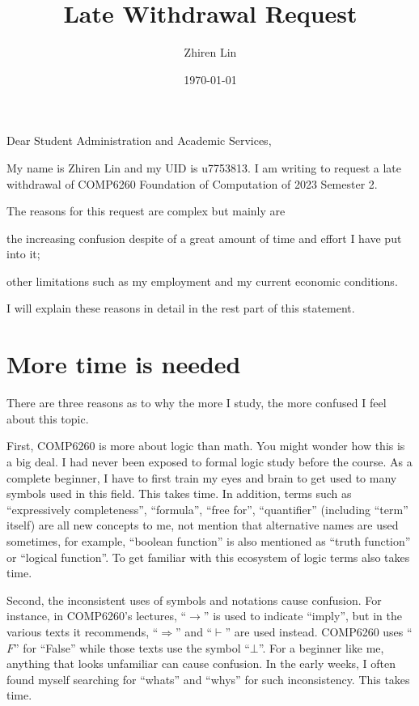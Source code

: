 \documentclass[12pt,a4paper]{article}
\title{Late Withdrawal Request}
\author{Zhiren Lin}
\date{\today}
\begin{document}
\maketitle

\noindent
Dear Student Administration and Academic Services,

My name is Zhiren Lin and my UID is u7753813. I am writing to request a late withdrawal of COMP6260 Foundation of Computation of 2023 Semester 2.

The reasons for this request are complex but mainly are
\begin{enumerate*}[label={(\alph*)}, font=\bfseries]
\item the increasing confusion despite of a great amount of time and effort I have put into it;
\item other limitations such as my employment and my current economic conditions.
\end{enumerate*}
I will explain these reasons in detail in the rest part of this statement.

\section{More time is needed}
There are three reasons as to why the more I study, the more confused I feel about this topic.

First, COMP6260 is more about logic than math. You might wonder how this is a big deal. I had never been exposed to formal logic study before the course. As a complete beginner, I have to first train my eyes and brain to get used to many symbols used in this field. This takes time. In addition, terms such as ``expressively completeness'', ``formula'', ``free for'', ``quantifier'' (including ``term'' itself) are all new concepts to me, not mention that alternative names are used sometimes, for example, ``boolean function'' is also mentioned as ``truth function'' or ``logical function''. To get familiar with this ecosystem of logic terms also takes time.


Second, the inconsistent uses of symbols and notations cause confusion. For instance, in COMP6260's lectures, ``$\rightarrow$'' is used to indicate ``imply'', but in the various texts it recommends, ``$\Rightarrow$'' and ``$\vdash$'' are used instead. COMP6260 uses ``$F$'' for ``False'' while those texts use the symbol ``$\bot$''. For a beginner like me, anything that looks unfamiliar can cause confusion. In the early weeks, I often found myself searching for ``whats'' and ``whys'' for such inconsistency. This takes time.
\end{document}
